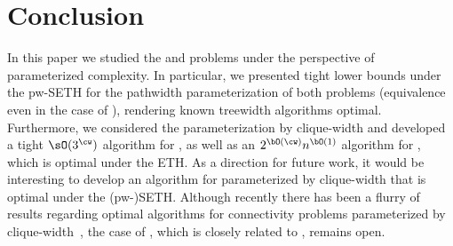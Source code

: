 \section{Conclusion}\label{sec:conclusion}
In this paper we studied the {\InducedM} and {\AcyclicM} problems under the perspective of parameterized complexity.
In particular, we presented tight lower bounds under the pw-SETH for the pathwidth parameterization of both problems
(equivalence even in the case of \InducedM), rendering known treewidth algorithms optimal.
Furthermore, we considered the parameterization by clique-width and developed a tight $\sO(3^{\cw})$ algorithm for \InducedM,
as well as an $2^{\bO(\cw)} n^{\bO(1)}$ algorithm for \AcyclicM, which is optimal under the ETH.
As a direction for future work, it would be interesting to develop an algorithm for {\AcyclicM} parameterized by clique-width
that is optimal under the (pw-)SETH.
Although recently there has been a flurry of results regarding optimal algorithms for connectivity problems parameterized by clique-width~\cite{arxiv/BojikianK24,icalp/BojikianK24,esa/HegerfeldK23},
the case of \FVS, which is closely related to \AcyclicM, remains open.
